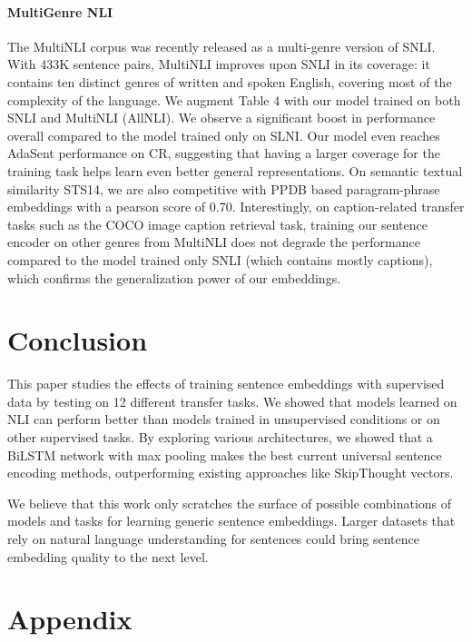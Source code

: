 \documentclass[11pt,letterpaper]{article}
\begin{document}
\paragraph{MultiGenre NLI} The MultiNLI corpus
\cite{williams2017broad} was recently released as a multi-genre version of SNLI. With 433K sentence pairs, MultiNLI improves upon SNLI in its coverage: it contains ten distinct genres of written and spoken English, covering most of the complexity of the language. We augment Table 4 with our model trained on both SNLI and MultiNLI (AllNLI). We observe a significant boost in performance overall compared to the model trained only on SLNI. Our model even reaches AdaSent performance on CR, suggesting that having a larger coverage for the training task helps learn even better general representations. On semantic textual similarity STS14, we are also competitive with PPDB based paragram-phrase embeddings with a pearson score of 0.70. Interestingly, on caption-related transfer tasks such as the COCO image caption retrieval task, training our sentence encoder on other genres from MultiNLI does not degrade the performance compared to the model trained only SNLI (which contains mostly captions), which confirms the generalization power of our embeddings.

\section{Conclusion}
This paper studies the effects of training sentence embeddings with supervised data by testing on 12 different transfer tasks. We showed that models learned on NLI can perform better than models trained in unsupervised conditions or on other supervised tasks. By exploring various architectures, we showed that a BiLSTM network with max pooling makes the best current universal sentence encoding methods, outperforming existing approaches like SkipThought vectors.

We believe that this work only scratches the surface of possible combinations of models and tasks for learning generic sentence embeddings. Larger datasets that rely on natural language understanding for sentences could bring sentence embedding quality to the next level.




\clearpage
\newpage

\section*{Appendix}
\end{document}
